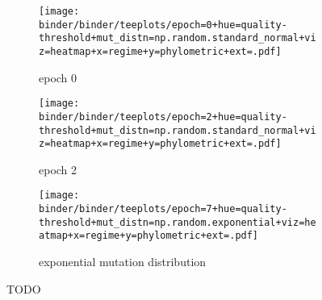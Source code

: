 \begin{figure*}
  \centering
  \begin{subfigure}[b]{\textwidth}
    \centering
    \texttt{[image: binder/binder/teeplots/epoch=0+hue=quality-threshold+mut\_distn=np.random.standard\_normal+viz=heatmap+x=regime+y=phylometric+ext=.pdf]}
    \caption{%
      epoch 0}
    \label{fig:reconstructed-tree-phylometrics-error-sensitivity-analysis:epoch0}
  \end{subfigure}
  \begin{subfigure}[b]{\textwidth}
    \centering
    \texttt{[image: binder/binder/teeplots/epoch=2+hue=quality-threshold+mut\_distn=np.random.standard\_normal+viz=heatmap+x=regime+y=phylometric+ext=.pdf]}
    \caption{%
      epoch 2}
    \label{fig:reconstructed-tree-phylometrics-error-sensitivity-analysis:epoch2}
  \end{subfigure}
  \begin{subfigure}[b]{\textwidth}
    \centering
    \texttt{[image: binder/binder/teeplots/epoch=7+hue=quality-threshold+mut\_distn=np.random.exponential+viz=heatmap+x=regime+y=phylometric+ext=.pdf]}
    \caption{%
      exponential mutation distribution}
    \label{fig:reconstructed-tree-phylometrics-error-sensitivity-analysis:exponential}
  \end{subfigure}
  \caption{%
    TODO}
  \label{fig:reconstructed-tree-phylometrics-error-sensitivity-analysis}
\end{figure*}
